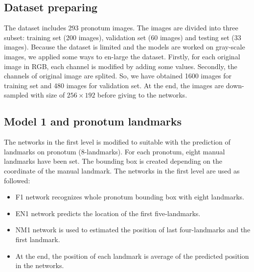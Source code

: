 \subsection{Dataset preparing}
The dataset includes 293 pronotum images. The images are divided into three subset: training set (200 images), validation set (60 images) and testing set (33 images). Because the dataset is limited and the models are worked on gray-scale images, we applied some ways to en-large the dataset. Firstly, for each original image in RGB, each channel is modified by adding some values. Secondly, the channels of original image are splited. So, we have obtained 1600 images for training set and 480 images for validation set. At the end, the images are down-sampled with size of $256 \times 192$ before giving to the networks.

\subsection{Model 1 and pronotum landmarks}
The networks in the first level is modified to suitable with the prediction of landmarks on pronotum (8-landmarks). For each pronotum, eight manual landmarks have been set. The bounding box is created depending on the coordinate of the manual landmark. The networks in the first level are used as followed:
\begin{itemize}
	\item F1 network recognizes whole pronotum bounding box with eight landmarks.
	\item EN1 network predicts the location of the first five-landmarks.
	\item NM1 network is used to estimated the position of last four-landmarks and the first landmark.
	\item At the end, the position of each landmark is average of the predicted position in the networks.
\end{itemize} 
